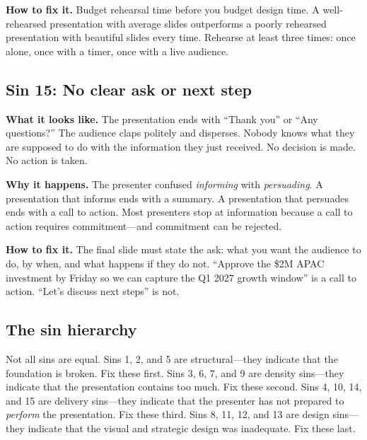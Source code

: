 \textbf{How to fix it.} Budget rehearsal time before you budget design time. A well-rehearsed presentation with average slides outperforms a poorly rehearsed presentation with beautiful slides every time. Rehearse at least three times: once alone, once with a timer, once with a live audience.


\subsection{Sin 15: No clear ask or next step}

\textbf{What it looks like.} The presentation ends with ``Thank you'' or ``Any questions?'' The audience claps politely and disperses. Nobody knows what they are supposed to do with the information they just received. No decision is made. No action is taken.

\textbf{Why it happens.} The presenter confused \emph{informing} with \emph{persuading}. A presentation that informs ends with a summary. A presentation that persuades ends with a call to action. Most presenters stop at information because a call to action requires commitment---and commitment can be rejected.

\textbf{How to fix it.} The final slide must state the ask: what you want the audience to do, by when, and what happens if they do not. ``Approve the \$2M APAC investment by Friday so we can capture the Q1 2027 growth window'' is a call to action. ``Let's discuss next steps'' is not.



\subsection{The sin hierarchy}

Not all sins are equal. Sins 1, 2, and 5 are structural---they indicate that the foundation is broken. Fix these first. Sins 3, 6, 7, and 9 are density sins---they indicate that the presentation contains too much. Fix these second. Sins 4, 10, 14, and 15 are delivery sins---they indicate that the presenter has not prepared to \emph{perform} the presentation. Fix these third. Sins 8, 11, 12, and 13 are design sins---they indicate that the visual and strategic design was inadequate. Fix these last.


